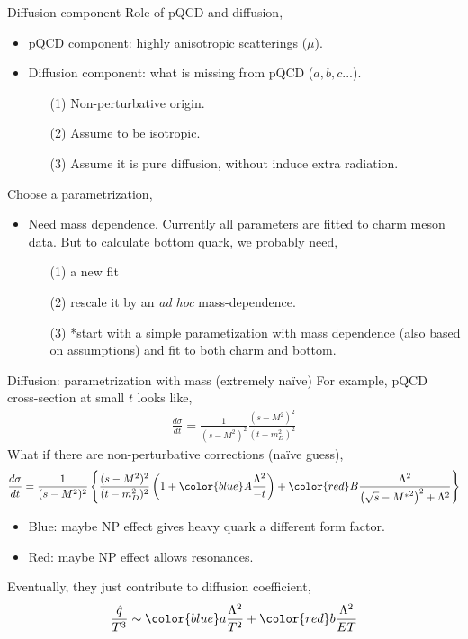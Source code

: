 \documentclass[11pt]{beamer}
\begin{document}
\begin{frame}{Diffusion component}
Role of pQCD and diffusion,
\begin{itemize}
\item pQCD component: highly anisotropic scatterings ($\mu$).
\item Diffusion component: what is missing from pQCD ($a,b,c...$).
\begin{itemize}
\item[(1)] Non-perturbative origin.
\item[(2)] Assume to be isotropic.
\item[(3)] Assume it is pure diffusion, without induce extra radiation.
\end{itemize}
\end{itemize}
Choose a parametrization,
\begin{itemize}
\item Need mass dependence. Currently all parameters are fitted to charm meson data. But to calculate bottom quark, we probably need,
\begin{itemize}
\item[(1)] a new fit
\item[(2)] rescale it by an {\it ad hoc} mass-dependence.
\item[(3)] *start with a simple parametization with mass dependence (also based on assumptions) and fit to both charm and bottom.
\end{itemize}
\end{itemize}
\end{frame}

\begin{frame}{Diffusion: parametrization with mass (extremely na\"ive)}
For example, pQCD cross-section at small $t$ looks like,
\begin{eqnarray}
\nonumber
\frac{d\sigma}{dt} = \frac{1}{(s-M^2)^2} \frac{(s-M^2)^2}{(t-m_D^2)^2}
\end{eqnarray}
What if there are non-perturbative corrections (na\"ive guess),
\begin{eqnarray}
\nonumber
\frac{d\sigma}{dt} = \frac{1}{(s-M^2)^2} \left\{ \frac{(s-M^2)^2}{(t-m_D^2)^2}\left(1 + {\color{blue}A\frac{\Lambda^2}{-t}}\right) + {\color{red} B\frac{\Lambda^2}{\left(\sqrt{s}-{M^*}^2\right)^2+\Lambda^2}} \right\}
\end{eqnarray}
\begin{itemize}
\item {\color{blue} Blue:} maybe NP effect gives heavy quark a different form factor.
\item {\color{red} Red:} maybe NP effect allows resonances.
\end{itemize}

Eventually, they just contribute to diffusion coefficient,
\begin{eqnarray}
\nonumber
\frac{\hat{q}}{T^3} \sim  {\color{blue}a\frac{\Lambda^2}{T^2}} + {\color{red}b\frac{\Lambda^2}{ET}}
\end{eqnarray}
\end{frame}
\end{document}

